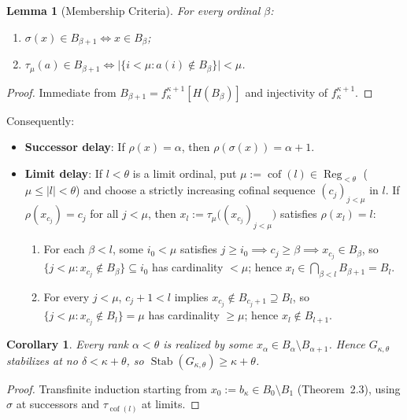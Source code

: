 \documentclass[11pt,a4paper]{article}
\theoremstyle{definition}
\theoremstyle{plain}
\newtheorem{lemma}[definition]{Lemma}
\newtheorem{corollary}[definition]{Corollary}
\newcommand{\Stab}{\operatorname{Stab}}
\newcommand{\cof}{\operatorname{cof}}
\newcommand{\Reg}{\operatorname{Reg}}
\begin{document}
\begin{lemma}[Membership Criteria]
For every ordinal $\beta$:
\begin{enumerate}[label=(\arabic*)]
  \item $\sigma(x) \in B_{\beta+1} \iff x \in B_\beta$;
  \item $\tau_\mu(a) \in B_{\beta+1} \iff \bigl|\{i < \mu : a(i) \notin B_\beta\}\bigr| < \mu$.
\end{enumerate}
\end{lemma}

\begin{proof}
Immediate from $B_{\beta+1} = f_\kappa^{\kappa+1}[H(B_\beta)]$ and injectivity of $f_\kappa^{\kappa+1}$.
\end{proof}

Consequently:
\begin{itemize}[leftmargin=2em]
  \item \textbf{Successor delay}: If $\rho(x) = \alpha$, then $\rho(\sigma(x)) = \alpha + 1$.
  \item \textbf{Limit delay}: If $l < \theta$ is a limit ordinal, put $\mu := \cof(l) \in \Reg_{<\theta}$ ($\mu \le |l| < \theta$) and choose a strictly increasing cofinal sequence $(c_j)_{j<\mu}$ in $l$. If $\rho(x_{c_j}) = c_j$ for all $j < \mu$, then $x_l := \tau_\mu\bigl((x_{c_j})_{j<\mu}\bigr)$ satisfies $\rho(x_l) = l$:
    \begin{enumerate}[label=(\roman*)]
      \item For each $\beta < l$, some $i_0 < \mu$ satisfies $j \ge i_0 \implies c_j \ge \beta \implies x_{c_j} \in B_\beta$, so $\{j < \mu : x_{c_j} \notin B_\beta\} \subseteq i_0$ has cardinality $<\mu$; hence $x_l \in \bigcap_{\beta<l} B_{\beta+1} = B_l$.
      \item For every $j < \mu$, $c_j + 1 < l$ implies $x_{c_j} \notin B_{c_j+1} \supseteq B_l$, so $\{j < \mu : x_{c_j} \notin B_l\} = \mu$ has cardinality $\ge \mu$; hence $x_l \notin B_{l+1}$.
    \end{enumerate}
\end{itemize}

\begin{corollary}
Every rank $\alpha < \theta$ is realized by some $x_\alpha \in B_\alpha \setminus B_{\alpha+1}$. Hence $G_{\kappa,\theta}$ stabilizes at no $\delta < \kappa + \theta$, so $\Stab(G_{\kappa,\theta}) \ge \kappa + \theta$.
\end{corollary}

\begin{proof}
Transfinite induction starting from $x_0 := b_\kappa \in B_0 \setminus B_1$ (Theorem~2.3), using $\sigma$ at successors and $\tau_{\cof(l)}$ at limits.
\end{proof}
\end{document}
